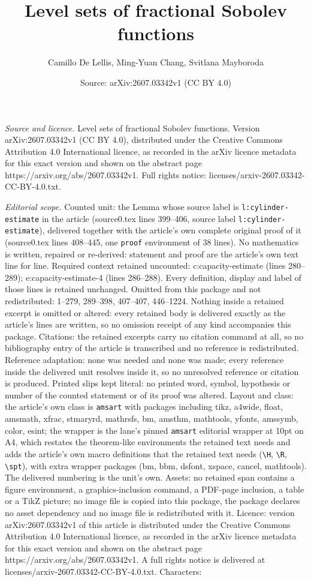 \documentclass[10pt,a4paper]{amsart}
\title[Level sets of fractional Sobolev functions]{Level sets of fractional Sobolev functions}
\author{Camillo De Lellis, Ming-Yuan Chang, Svitlana Mayboroda}
\date{Source: arXiv:2607.03342v1 (CC BY 4.0)}
\begin{document}
\maketitle

\noindent\emph{Source and licence.} Level sets of fractional Sobolev functions. Version arXiv:2607.03342v1 (CC BY 4.0), distributed under the Creative Commons Attribution 4.0 International licence, as recorded in the arXiv licence metadata for this exact version and shown on the abstract page https://arxiv.org/abs/2607.03342v1. Full rights notice: licenses/arxiv-2607.03342-CC-BY-4.0.txt.\par\smallskip

\noindent\textit{Editorial scope.} Counted unit: the Lemma whose source label is \texttt{l:cylinder-estimate} in the article (source0.tex lines 399--406, source label \texttt{l:cylinder-estimate}), delivered together with the article's own complete original proof of it (source0.tex lines 408--445, one \texttt{proof} environment of 38 lines). No mathematics is written, repaired or re-derived: statement and proof are the article's own text line for line. Required context retained uncounted: c:capacity-estimate (lines 280--289); e:capacity-estimate-4 (lines 286--288). Every definition, display and label of those lines is retained unchanged. Omitted from this package and not redistributed: 1--279, 289--398, 407--407, 446--1224. Nothing inside a retained excerpt is omitted or altered: every retained body is delivered exactly as the article's lines are written, so no omission receipt of any kind accompanies this package. Citations: the retained excerpts carry no citation command at all, so no bibliography entry of the article is transcribed and no reference is redistributed. Reference adaptation: none was needed and none was made; every reference inside the delivered unit resolves inside it, so no unresolved reference or citation is produced. Printed slips kept literal: no printed word, symbol, hypothesis or number of the counted statement or of its proof was altered. Layout and class: the article's own class is \texttt{amsart} with packages including tikz, a4wide, float, amsmath, xfrac, stmaryrd, mathrsfs, bm, amsthm, mathtools, yfonts, amssymb, color, esint; the wrapper is the lane's pinned \texttt{amsart} editorial wrapper at 10pt on A4, which restates the theorem-like environments the retained text needs and adds the article's own macro definitions that the retained text needs (\texttt{\textbackslash H}, \texttt{\textbackslash R}, \texttt{\textbackslash spt}), with extra wrapper packages (bm, bbm, dsfont, xspace, cancel, mathtools). The delivered numbering is the unit's own. Assets: no retained span contains a figure environment, a graphics-inclusion command, a PDF-page inclusion, a table or a TikZ picture; no image file is copied into this package, the package declares no asset dependency and no image file is redistributed with it. Licence: version arXiv:2607.03342v1 of this article is distributed under the Creative Commons Attribution 4.0 International licence, as recorded in the arXiv licence metadata for this exact version and shown on the abstract page https://arxiv.org/abs/2607.03342v1. A full rights notice is delivered at licenses/arxiv-2607.03342-CC-BY-4.0.txt. Characters: 
\end{document}
